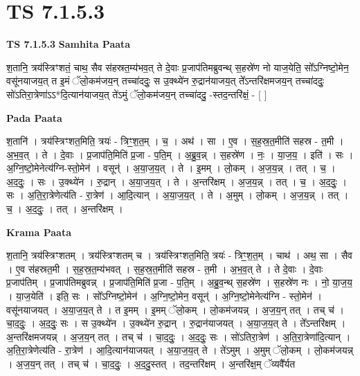 \documentclass[17pt]{extarticle}
\begin{document}
\section{ TS 7.1.5.3 }

\textbf{TS 7.1.5.3 } \newline
\textbf{Samhita Paata} \newline

श॒तानि॒ त्रय॑स्त्रिꣳशतं॒ चाथ॒ सैव स॑हस्रत॒म्य॑भव॒त् ते दे॒वाः प्र॒जाप॑तिमब्रुवन्थ् स॒हस्रे॑ण नो याज॒येति॒ सो᳚ऽग्निष्टो॒मेन॒ वसू॑नयाजय॒त् त इ॒मं ॅलो॒कम॑जय॒न् तच्चा॑ददुः॒ स उ॒क्थ्ये॑न रु॒द्रान॑याजय॒त् ते᳚ऽन्तरि॑क्षमजय॒न् तच्चा॑ददुः॒ सो॑ऽतिरा॒त्रेणा॑ऽऽ*दि॒त्यान॑याजय॒त् ते॑ऽमुं ॅलो॒कम॑जय॒न् तच्चा॑ददु॒ -स्तद॒न्तरि॑क्षं॒ - [  ] \newline

\textbf{Pada Paata} \newline

श॒तानि॑ । त्रय॑स्त्रिꣳशत॒मिति॒ त्रयः॑ - त्रिꣳ॒॒श॒त॒म् । च॒ । अथ॑ । सा । ए॒व । स॒ह॒स्र॒त॒मीति॑ सहस्र - त॒मी । अ॒भ॒व॒त् । ते । दे॒वाः । प्र॒जाप॑ति॒मिति॑ प्र॒जा - प॒ति॒म् । अ॒ब्रु॒व॒न्न् । स॒हस्रे॑ण । नः॒ । या॒ज॒य॒ । इति॑ । सः । अ॒ग्नि॒ष्टो॒मेनेत्य॑ग्नि-स्तो॒मेन॑ । वसून्॑ । अ॒या॒ज॒य॒त् । ते । इ॒मम् । लो॒कम् । अ॒ज॒य॒न्न् । तत् । च॒ । अ॒द॒दुः॒ । सः । उ॒क्थ्ये॑न । रु॒द्रान् । अ॒या॒ज॒य॒त् । ते । अ॒न्तरि॑क्षम् । अ॒ज॒य॒न्न् । तत् । च॒ । अ॒द॒दुः॒ । सः । अ॒ति॒रा॒त्रेणेत्य॑ति - रा॒त्रेण॑ । आ॒दि॒त्यान् । अ॒या॒ज॒य॒त् । ते । अ॒मुम् । लो॒कम् । अ॒ज॒य॒न्न् । तत् । च॒ । अ॒द॒दुः॒ । तत् । अ॒न्तरि॑क्षम् ।  \newline


\textbf{Krama Paata} \newline

श॒तानि॒ त्रय॑स्त्रिꣳशतम् । त्रय॑स्त्रिꣳशतम् च । त्रय॑स्त्रिꣳशत॒मिति॒ त्रयः॑ - त्रिꣳ॒॒श॒त॒म् । चाथ॑ । अथ॒ सा । सैव । ए॒व स॑हस्रत॒मी । स॒ह॒स्र॒त॒म्य॑भवत् । स॒ह॒स्र॒त॒मीति॑ सहस्र - त॒मी । अ॒भ॒व॒त् ते । ते दे॒वाः । दे॒वाः प्र॒जाप॑तिम् । प्र॒जाप॑तिमब्रुवन्न् । प्र॒जाप॑ति॒मिति॑ प्र॒जा - प॒ति॒म् । अ॒ब्रु॒व॒न्थ् स॒हस्रे॑ण । स॒हस्रे॑ण नः । नो॒ या॒ज॒य॒ । या॒ज॒येति॑ । इति॒ सः । सो᳚ऽग्निष्टो॒मेन॑ । अ॒ग्नि॒ष्टो॒मेन॒ वसून्॑ । अ॒ग्नि॒ष्टो॒मेनेत्य॑ग्नि - स्तो॒मेन॑ । वसू॑नयाजयत् । अ॒या॒ज॒य॒त् ते । त इ॒मम् । इ॒मम् ॅलो॒कम् । लो॒कम॑जयन्न् । अ॒ज॒य॒न् तत् । तच् च॑ । चा॒द॒दुः॒ । अ॒द॒दुः॒ सः । स उ॒क्थ्ये॑न । उ॒क्थ्ये॑न रु॒द्रान् । रु॒द्रान॑याजयत् । अ॒या॒ज॒य॒त् ते । ते᳚ऽन्तरि॑क्षम् । अ॒न्तरि॑क्षमजयन्न् । अ॒ज॒य॒न् तत् । तच् च॑ । चा॒द॒दुः॒ । अ॒द॒दुः॒ सः । सो॑ऽतिरा॒त्रेण॑ । अ॒ति॒रा॒त्रेणा॑दि॒त्यान् । अ॒ति॒रा॒त्रेणेत्य॑ति - रा॒त्रेण॑ । आ॒दि॒त्यान॑याजयत् । अ॒या॒ज॒य॒त् ते । ते॑ऽमुम् । अ॒मुम् ॅलो॒कम् । लो॒कम॑जयन्न् । अ॒ज॒य॒न् तत् । तच् च॑ । चा॒द॒दुः॒ । अ॒द॒दु॒स्तत् । तद॒न्तरि॑क्षम् । अ॒न्तरि॑क्ष॒म् ॅव्यवै᳚र्यत \newline
\end{document}
